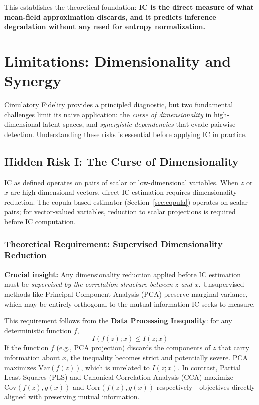 \documentclass[10pt]{article} %
\theoremstyle{plain}
\theoremstyle{definition}
\newcommand{\Var}{\mathrm{Var}}
\newcommand{\Cov}{\mathrm{Cov}}
\begin{document}
\noindent This establishes the theoretical foundation: \textbf{IC is the direct measure of what mean-field approximation discards, and it predicts inference degradation without any need for entropy normalization.}

\section{Limitations: Dimensionality and Synergy}
\label{sec:risks}

Circulatory Fidelity provides a principled diagnostic, but two fundamental challenges limit its naive application: the \emph{curse of dimensionality} in high-dimensional latent spaces, and \emph{synergistic dependencies} that evade pairwise detection. Understanding these risks is essential before applying IC in practice.

\subsection{Hidden Risk I: The Curse of Dimensionality}
\label{sec:dimensionality}

IC as defined operates on pairs of scalar or low-dimensional variables. When $z$ or $x$ are high-dimensional vectors, direct IC estimation requires dimensionality reduction. The copula-based estimator (Section~\ref{sec:copula}) operates on scalar pairs; for vector-valued variables, reduction to scalar projections is required before IC computation.

\subsubsection{Theoretical Requirement: Supervised Dimensionality Reduction}

\textbf{Crucial insight:} Any dimensionality reduction applied before IC estimation must be \emph{supervised by the correlation structure between $z$ and $x$}. Unsupervised methods like Principal Component Analysis (PCA) preserve marginal variance, which may be entirely orthogonal to the mutual information IC seeks to measure.

This requirement follows from the \textbf{Data Processing Inequality}: for any deterministic function $f$,
\begin{equation}
I(f(z); x) \leq I(z; x)
\end{equation}
If the function $f$ (e.g., PCA projection) discards the components of $z$ that carry information about $x$, the inequality becomes strict and potentially severe. PCA maximizes $\Var(f(z))$, which is unrelated to $I(z; x)$. In contrast, Partial Least Squares (PLS) and Canonical Correlation Analysis (CCA) maximize $\Cov(f(z), g(x))$ and $\text{Corr}(f(z), g(x))$ respectively---objectives directly aligned with preserving mutual information.
\end{document}
